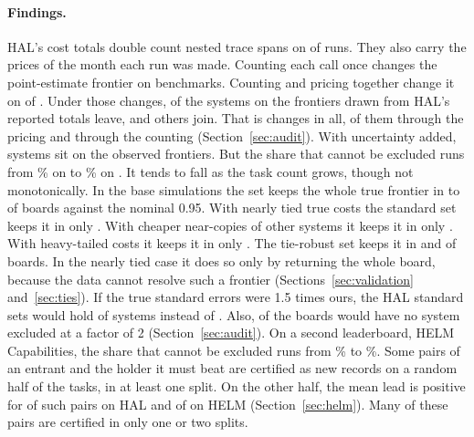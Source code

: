 \documentclass[11pt]{article}
\begin{document}
\paragraph{Findings.}
HAL's cost totals double count nested trace spans on \NumDupRunsAffected{} of \NumDupRunsTotal{} runs. They also carry the prices of the month each run was made. Counting each call once changes the point-estimate frontier on \NumFlipBoardsChangedCounting{} benchmarks. Counting and pricing together change it on \NumFlipBoardsChanged{} of \NumFlipBoards{}. Under those changes, \NumFlipLost{} of the \NumFlipFrontierReported{} systems on the frontiers drawn from HAL's reported totals leave, and \NumFlipGained{} others join. That is \NumFlipSystemsChanged{} changes in all, \NumFlipPricing{} of them through the pricing and \NumFlipCounting{} through the counting (Section~\ref{sec:audit}). With uncertainty added, \NumHalObservedFrontier{} systems sit on the observed frontiers. But the share that cannot be excluded runs from \NumHalSetShareMinPct\% on \NumHalSetShareMinName{} to \NumHalSetShareMaxPct\% on \NumHalSetShareMaxNames{}. It tends to fall as the task count grows, though not monotonically. In the base simulations the set keeps the whole true frontier in \NumValBaseJointMin{} to \NumValBaseJointMax{} of boards against the nominal 0.95. With nearly tied true costs the standard set keeps it in only \NumValScNearTiedCostsJoint{}. With cheaper near-copies of other systems it keeps it in only \NumValScCheaperNearCopiesJoint{}. With heavy-tailed costs it keeps it in only \NumValScHeavyTailedCostsJoint{}. The tie-robust set keeps it in \NumValScNearTiedCostsRobJoint{} and \NumValScCheaperNearCopiesRobJoint{} of boards. In the nearly tied case it does so only by returning the whole board, because the data cannot resolve such a frontier (Sections~\ref{sec:validation} and~\ref{sec:ties}). If the true standard errors were 1.5 times ours, the HAL standard sets would hold \NumInflHalSetOneFive{} of \NumInflHalSystems{} systems instead of \NumInflHalSetOne{}. Also, \NumInflHalWholeBoardsAtTwo{} of the \NumInflHalBoards{} boards would have no system excluded at a factor of 2 (Section~\ref{sec:audit}). On a second leaderboard, HELM Capabilities, the share that cannot be excluded runs from \NumHelmSetShareMinPct\% to \NumHelmSetShareMaxPct\%. Some pairs of an entrant and the holder it must beat are certified as new records on a random half of the tasks, in at least one split. On the other half, the mean lead is positive for \NumReplHalCertPairsLeadPos{} of \NumReplHalCertPairs{} such pairs on HAL and \NumReplHelmCertPairsLeadPos{} of \NumReplHelmCertPairs{} on HELM (Section~\ref{sec:helm}). Many of these pairs are certified in only one or two splits.
\end{document}
